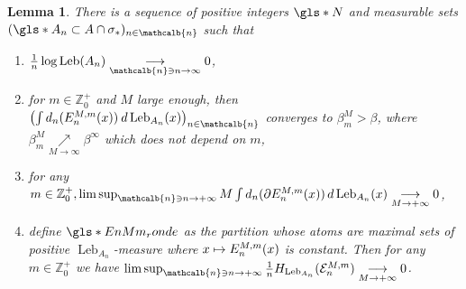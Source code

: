 \documentclass[10pt]{amsart}
\newenvironment{enumeratei}
{\bgroup\def\theenumi{\roman{enumi}}\def\theenumii{\arabic{enumii}}\begin{enumerate}}
{\end{enumerate}\egroup}
\newcommand\mto{\mathchoice{\longmapsto}{\mapsto}{\mapsto}{\mapsto}}
\DeclareMathOperator{\Leb}{Leb}
\newcommand{\mcbn}{{\mathcalb{n}}}
\newtheorem{lem}[thm]{Lemma}
\theoremstyle{definition}
\newcommand{\bbZ}{{\mathbb{Z}}}
\begin{document}
\begin{lem}
\label{lem:def-An}
There is a sequence of positive integers $\gls*{N}$ and measurable sets $(\gls*{A_n} \subset A \cap \sigma_*)_{n \in \mcbn}$ such that
\begin{enumeratei}
\item\label{lem:def-Ani}
 $\frac{1}{n}\log \Leb(A_n) \underset{\mcbn \ni n \to \infty}{\longrightarrow} 0$,
\item\label{lem:def-Anii}
 for $m \in \bbZ_0^+$ and $M$ large enough, then $\left (\int d_n(E_n^{M,m}(x)) \: d \Leb_{A_n}(x) \right)_{n \in \mcbn}$ converges to $\beta_m^M > \beta$, where $\beta_m^M \underset{M \to \infty}{\nearrow} \beta^{\infty}$ which does not depend on $m$,
\item\label{lem:def-Aniii}
 for any $m \in \bbZ_0^+, \limsup_{\mcbn \ni n \to +\infty} M \int d_n(\partial E_n^{M,m}(x))\, d \Leb_{A_n}(x) \underset{M \to +\infty}{\longrightarrow} 0$,
\item\label{lem:def-Aniv}
 define
$\gls*{EnMm_ronde}$ as the partition whose atoms are maximal sets of positive $\Leb_{A_n}$-measure where $x \mto E_n^{M,m}(x)$ is constant. Then for any $m \in \bbZ_0^+$ we have
$\limsup_{\mcbn \ni n \to +\infty}\frac{1}{n} H_{\Leb_{A_n}}(\mathcal{E}_n^{M,m})\underset{M \to +\infty}{\longrightarrow} 0$.
\end{enumeratei}
\end{lem}
\end{document}
